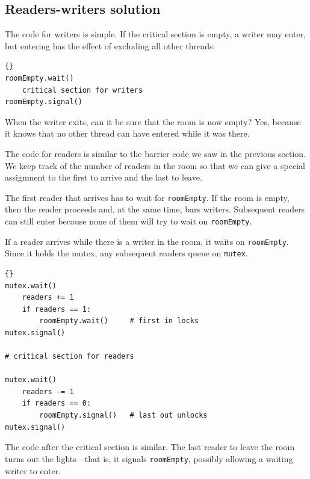 \documentclass{book}
\newcommand{\clearemptydoublepage}{\newpage\cleardoublepage}
\begin{document}
\clearemptydoublepage
\subsection {Readers-writers solution}

The code for writers is simple.  If the critical section
is empty, a writer may enter, but entering has the effect
of excluding all other threads:

\begin{latin}
\begin{latin}
\begin{lstlisting}[title={Writers solution}]{}
roomEmpty.wait()
    critical section for writers
roomEmpty.signal()
\end{lstlisting}
\end{latin}
\end{latin}

When the writer exits, can it be sure that the room is
now empty?  Yes, because it knows that no other thread can
have entered while it was there.

The code for readers is similar to the barrier code we
saw in the previous section.  We keep track of the number
of readers in the room so that we can give a special assignment
to the first to arrive and the last to leave.

The first reader that arrives has to wait for {\tt roomEmpty}.
If the room is empty, then the reader proceeds and, at the
same time, bars writers.  Subsequent readers can still enter
because none of them will try to wait on {\tt roomEmpty}.

If a reader arrives while there is a writer in the room,
it waits on {\tt roomEmpty}.  Since it holds the mutex, any
subsequent readers queue on {\tt mutex}.

\begin{latin}
\begin{latin}
\begin{lstlisting}[title={Readers solution}]{}
mutex.wait()
    readers += 1
    if readers == 1:
        roomEmpty.wait()     # first in locks
mutex.signal()

# critical section for readers

mutex.wait()
    readers -= 1
    if readers == 0:
        roomEmpty.signal()   # last out unlocks
mutex.signal()
\end{lstlisting}
\end{latin}
\end{latin}

The code after the critical section is similar.  The last reader
to leave the room turns out the lights---that is, it signals
{\tt roomEmpty}, possibly allowing a waiting writer to enter.
\end{document}
